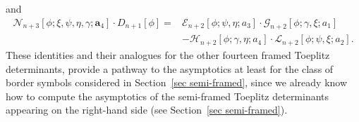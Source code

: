 \documentclass[10pt,a4paper]{amsart}
\numberwithin{equation}{section}
\newcommand{\ga}{\gamma}
\begin{document}
		and
		\begin{align*}%
			\mathscr{N}_{n+3}[\phi; \xi, \psi, \eta, \ga; \boldsymbol{a}_4] \cdot D_{n+1}[\phi]={}& \mathscr{E}_{n+2}[\phi;\psi,\eta;a_3] \cdot \mathscr{G}_{n+2}[\phi;\ga,\xi;a_1] \\
&- \mathscr{H}_{n+2}[\phi;\ga,\eta;a_4] \cdot \mathscr{L}_{n+2}[\phi;\psi,\xi;a_2].
		\end{align*}
		These identities and their analogues for the other fourteen framed Toeplitz determinants, provide a pathway to the asymptotics at least for the class of border symbols considered in Section~\ref{sec semi-framed}, since we already know how to compute the asymptotics of the semi-framed Toeplitz determinants appearing on the right-hand side (see Section~\ref{sec semi-framed}).
		
\end{document}
